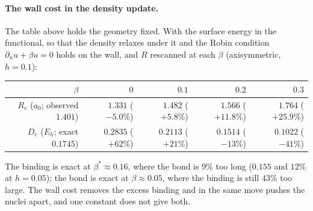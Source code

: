 \documentclass[11pt]{article}
\begin{document}
\paragraph{The wall cost in the density update.} The table above holds the geometry fixed. With the
surface energy in the functional, so that the density relaxes under it and the Robin condition
$\partial_n u+\beta u=0$ holds on the wall, and $R$ rescanned at each $\beta$ (axisymmetric, $h = 0.1$):
\begin{center}
\small
\begin{tabular}{rrrrr}
\toprule
$\beta$ & $0$ & $0.1$ & $0.2$ & $0.3$ \\
\midrule
$R_e$ ($a_0$; observed $1.401$) & $1.331$ ($-5.0\%$) & $1.482$ ($+5.8\%$) & $1.566$ ($+11.8\%$) & $1.764$ ($+25.9\%$) \\
$D_e$ ($E_h$; exact $0.1745$) & $0.2835$ ($+62\%$) & $0.2113$ ($+21\%$) & $0.1514$ ($-13\%$) & $0.1022$ ($-41\%$) \\
\bottomrule
\end{tabular}
\end{center}
The binding is exact at $\beta^* \approx 0.16$, where the bond is $9\%$ too long ($0.155$ and $12\%$ at
$h = 0.05$); the bond is exact at $\beta \approx 0.05$, where the binding is still $43\%$ too large. The wall
cost removes the excess binding and in the same move pushes the nuclei apart, and one constant does not give both.

\end{document}
